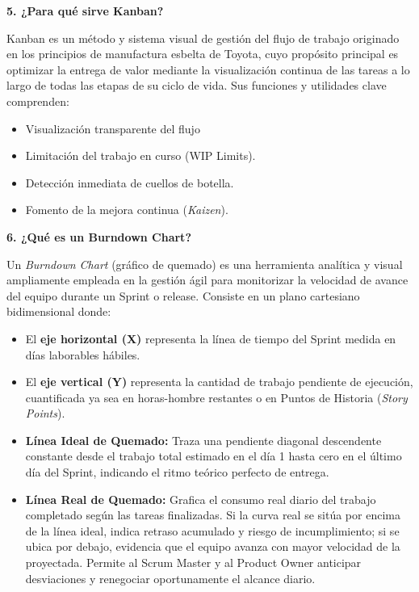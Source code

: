 \vspace{0.6em}
\noindent\textbf{\color{mauve} 5. ¿Para qué sirve Kanban?}\par
\noindent Kanban es un método y sistema visual de gestión del flujo de trabajo originado en los principios de manufactura esbelta de Toyota, cuyo propósito principal es optimizar la entrega de valor mediante la visualización continua de las tareas a lo largo de todas las etapas de su ciclo de vida. Sus funciones y utilidades clave comprenden:
\begin{itemize}
    \item Visualización transparente del flujo 
    \item Limitación del trabajo en curso (WIP Limits).
    \item Detección inmediata de cuellos de botella.
    \item Fomento de la mejora continua (\textit{Kaizen}).
\end{itemize}

\vspace{0.6em}
\noindent\textbf{\color{mauve} 6. ¿Qué es un Burndown Chart?}\par
\noindent Un \textit{Burndown Chart} (gráfico de quemado) es una herramienta analítica y visual ampliamente empleada en la gestión ágil para monitorizar la velocidad de avance del equipo durante un Sprint o release. Consiste en un plano cartesiano bidimensional donde:
\begin{itemize}
    \item El \textbf{eje horizontal (X)} representa la línea de tiempo del Sprint medida en días laborables hábiles.
    \item El \textbf{eje vertical (Y)} representa la cantidad de trabajo pendiente de ejecución, cuantificada ya sea en horas-hombre restantes o en Puntos de Historia (\textit{Story Points}).
    \item \textbf{Línea Ideal de Quemado:} Traza una pendiente diagonal descendente constante desde el trabajo total estimado en el día 1 hasta cero en el último día del Sprint, indicando el ritmo teórico perfecto de entrega.
    \item \textbf{Línea Real de Quemado:} Grafica el consumo real diario del trabajo completado según las tareas finalizadas. Si la curva real se sitúa por encima de la línea ideal, indica retraso acumulado y riesgo de incumplimiento; si se ubica por debajo, evidencia que el equipo avanza con mayor velocidad de la proyectada. Permite al Scrum Master y al Product Owner anticipar desviaciones y renegociar oportunamente el alcance diario.
\end{itemize}

